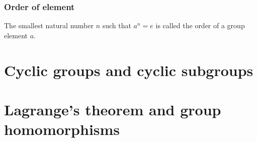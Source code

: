 \documentclass[oneside,11pt,pdftex]{book}%
\numberwithin{equation}{section}
\numberwithin{section}{chapter}
\numberwithin{equation}{chapter}
\begin{document}
\subsection{Order of element}
The smallest natural number $ n $ such that $ a^n=e $ is called the order of a group element $ a $.

\chapter{Cyclic groups and cyclic subgroups}


\chapter{Lagrange's theorem and group homomorphisms}
\backmatter



\thispagestyle{empty}%
{\ }
\newpage
\end{document}
